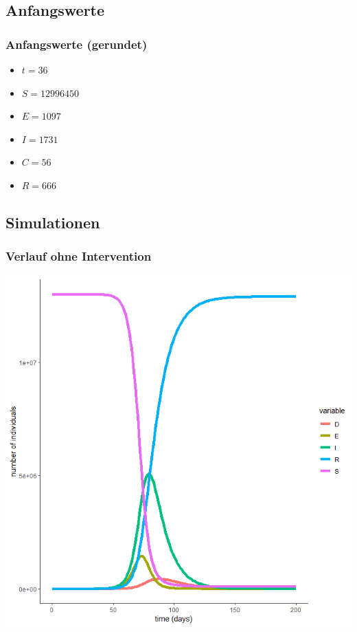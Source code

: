 \documentclass{beamer}
\begin{document}
\subsection{Anfangswerte}
\begin{frame}
	\frametitle{Anfangswerte (gerundet)}
	\begin{itemize}
		\item $t = 36$
		\item $S = 12 996 450$
		\item $E = 1097$
		\item $I = 1731$
		\item $C = 56$
		\item $R = 666$		
	\end{itemize}
\end{frame}

\subsection{Simulationen}
\begin{frame}
	\frametitle{Verlauf ohne Intervention}
	\begin{center}
		\includegraphics[scale=0.45]{delta=0,01,beta_unveraendert,alles.png}
	\end{center}
\end{frame}
\end{document}
